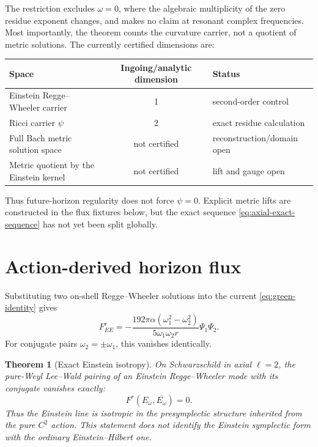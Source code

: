 \documentclass[11pt]{article}
\newtheorem{theorem}{Theorem}[section]
\theoremstyle{definition}
\theoremstyle{remark}
\begin{document}
The restriction excludes \(\omega=0\), where the algebraic multiplicity of
the zero residue exponent changes, and makes no claim at resonant complex
frequencies.  Most importantly, the theorem counts the curvature carrier,
not a quotient of metric solutions.  The currently certified dimensions are:

\begin{center}
\begin{tabularx}{0.94\textwidth}{@{}Y c Y@{}}
\toprule
Space & Ingoing/analytic dimension & Status\\
\midrule
Einstein Regge--Wheeler carrier & 1 & second-order control\\
Ricci carrier \(\psi\) & 2 & exact residue calculation\\
Full Bach metric solution space & not certified & reconstruction/domain open\\
Metric quotient by the Einstein kernel & not certified & lift and gauge open\\
\bottomrule
\end{tabularx}
\end{center}

Thus future-horizon regularity does not force \(\psi=0\).  Explicit metric
lifts are constructed in the flux fixtures below, but the exact sequence
\eqref{eq:axial-exact-sequence} has not yet been split globally.

\section{Action-derived horizon flux}

Substituting two on-shell Regge--Wheeler solutions into the current
\eqref{eq:green-identity} gives
\begin{equation}\label{eq:rw-null}
 F^r_{EE}
 =-\frac{192\pi\alpha(\omega_1^2-\omega_2^2)}
          {5\omega_1\omega_2r}\Psi_1\Psi_2.
\end{equation}
For conjugate pairs \(\omega_2=\pm\omega_1\), this vanishes identically.

\begin{theorem}[Exact Einstein isotropy]
On Schwarzschild in axial \(\ell=2\), the pure-Weyl Lee--Wald pairing of an
Einstein Regge--Wheeler mode with its conjugate vanishes exactly:
\begin{equation}
 F^r(E_\omega,\overline{E_\omega})=0.
\end{equation}
Thus the Einstein line is isotropic in the presymplectic structure inherited
from the pure \(C^2\) action.  This statement does not identify the Einstein
symplectic form with the ordinary Einstein--Hilbert one.
\end{theorem}
\end{document}
